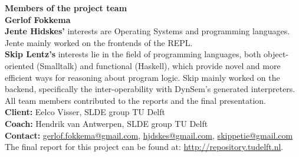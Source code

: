 \noindent\textbf{Members of the project team}\\
\textbf{Gerlof Fokkema}\\
\textbf{Jente Hidskes'} interests are Operating Systems and programming
languages. Jente mainly worked on the frontends of the REPL.\\
\textbf{Skip Lentz's} interests lie in the field of programming languages,
both object-oriented (Smalltalk) and functional (Haskell), which provide
novel and more efficient ways for reasoning about program logic. Skip mainly
worked on the backend, specifically the inter-operability with DynSem's
generated interpreters.\\

\noindent All team members contributed to the reports and the final
presentation.\\

\noindent\textbf{Client:} Eelco Visser, SLDE group TU Delft\\
\textbf{Coach:} Hendrik van Antwerpen, SLDE group TU Delft\\
\textbf{Contact:}
\href{mailto:gerlof.fokkema@gmail.com}{gerlof.fokkema@gmail.com},
\href{mailto:hjdskes@gmail.com}{hjdskes@gmail.com},
\href{mailto:skippetie@gmail.com}{skippetie@gmail.com}\\

\noindent The final report for this project can be found at: \url{http://repository.tudelft.nl}.

